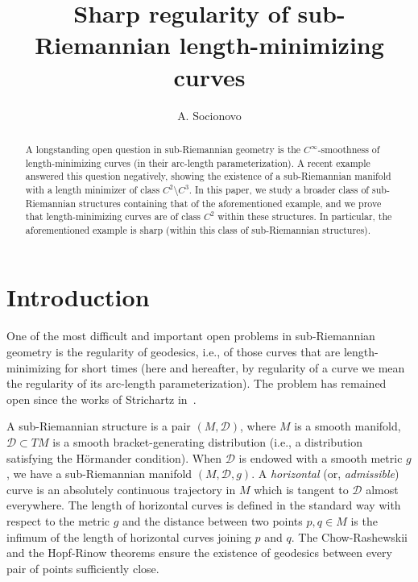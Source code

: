 \documentclass[12pt]{amsart}
\title{Sharp regularity of sub-Riemannian length-minimizing curves}
\theoremstyle{plain}
\theoremstyle{definition}
\theoremstyle{remark}
\numberwithin{equation}{section}
\newcommand{\D}{\mathcal{D}}
\newcommand{\<}{\langle}
\renewcommand{\>}{\rangle}
\newcommand{\0}{\theta}
\newcommand{\1}{{-1}}
\renewcommand{\=}{\coloneqq}
\renewcommand{\.}{\dots}
\renewcommand{\-}{\cdot}
\renewcommand{\:}{\,:\,}
\theoremstyle{definition}
\begin{document}
	
	

\author{A. Socionovo}

\address{Laboratoire Jacques-Louis Lions, Sorbonne Universit\'{e}, Universit\'{e} de Paris, CNRS, Inria, Paris, France}
\address{Unit\'{e} de Math\'ematiques Appliqu\'ees (UMA), ENSTA, Institut Polytechnique de Paris, 91120 Palaiseau, France}


\maketitle




\begin{abstract} 
	A longstanding open question in sub-Riemannian geometry is the $C^\infty$-smoothness of length-minimizing curves (in their arc-length parameterization). A recent example answered this question negatively, showing the existence of a sub-Riemannian manifold with a length minimizer of class $C^2\setminus C^3$. In this paper, we study a broader class of sub-Riemannian structures containing that of the aforementioned example, and we prove that length-minimizing curves are of class $C^2$ within these structures. In particular, the aforementioned example is sharp (within this class of sub-Riemannian structures).
\end{abstract}



\tableofcontents







\section{Introduction}


One of the most difficult and important open problems in sub-Riemannian geometry is the regularity of geodesics, i.e., of those curves that are length-minimizing for short times (here and hereafter, by regularity of a curve we mean the regularity of its arc-length parameterization). The problem has remained open since the works of Strichartz in~\cite{Str86, Str89}. 


A sub-Riemannian structure is a pair $(M,\D)$, where $M$ is a smooth manifold, $\D\subset TM$ is a smooth bracket-generating distribution (i.e., a distribution satisfying the H\"ormander condition). When $\D$ is endowed with a smooth metric $g$, we have a sub-Riemannian manifold $(M,\D,g)$. A {\em horizontal} (or, {\em admissible}) curve is an absolutely continuous trajectory in $M$ which is tangent to $\D$ almost everywhere. The length of horizontal curves is defined in the standard way with respect to the metric $g$ and the distance between two points $p,q\in M$ is the infimum of the length of horizontal curves joining $p$ and $q$. The Chow-Rashewskii and the Hopf-Rinow theorems ensure the existence of geodesics between every pair of points sufficiently close. 
\end{document}
